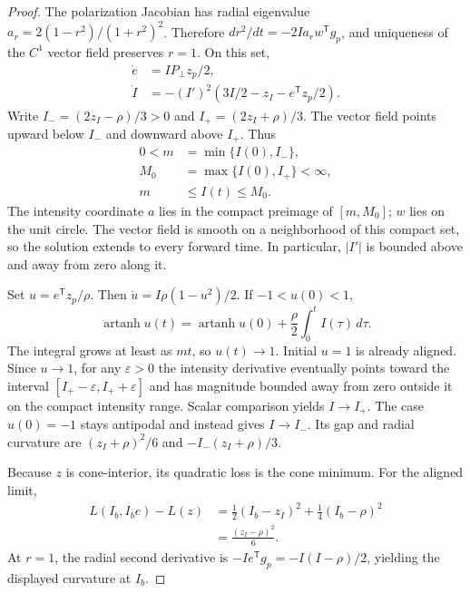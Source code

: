 \begin{proof}
The polarization Jacobian has radial eigenvalue $a_r=2(1-r^2)/(1+r^2)^2$. Therefore $d r^2/dt=-2Ia_r w^{\mathsf T}g_p$, and uniqueness of the $C^1$ vector field preserves $r=1$. On this set,
\begin{equation}
 \begin{aligned}
 \dot e&=I P_\perp z_p/2,\\
 \dot I&=-(I')^2(3I/2-z_I-e^{\mathsf T}z_p/2).
 \end{aligned}
\end{equation}
Write $I_-=(2z_I-\rho)/3>0$ and $I_+=(2z_I+\rho)/3$. The vector field points upward below $I_-$ and downward above $I_+$. Thus
\begin{equation}
 \begin{aligned}
 0<m&=\min\{I(0),I_-\},\\
 M_0&=\max\{I(0),I_+\}<\infty,\\
 m&\leq I(t)\leq M_0.
 \end{aligned}
\end{equation}
The intensity coordinate $a$ lies in the compact preimage of $[m,M_0]$; $w$ lies on the unit circle. The vector field is smooth on a neighborhood of this compact set, so the solution extends to every forward time. In particular, $|I'|$ is bounded above and away from zero along it.

Set $u=e^{\mathsf T}z_p/\rho$. Then $\dot u=I\rho(1-u^2)/2$. If $-1<u(0)<1$,
\begin{equation}
 \operatorname{artanh}u(t)=\operatorname{artanh}u(0)
        +\frac{\rho}{2}\int_0^t I(\tau)\,d\tau.
\end{equation}
The integral grows at least as $mt$, so $u(t)\to1$. Initial $u=1$ is already aligned. Since $u\to1$, for any $\varepsilon>0$ the intensity derivative eventually points toward the interval $[I_+-\varepsilon,I_++\varepsilon]$ and has magnitude bounded away from zero outside it on the compact intensity range. Scalar comparison yields $I\to I_+$. The case $u(0)=-1$ stays antipodal and instead gives $I\to I_-$. Its gap and radial curvature are $(z_I+\rho)^2/6$ and $-I_-(z_I+\rho)/3$.

Because $z$ is cone-interior, its quadratic loss is the cone minimum. For the aligned limit,
\begin{equation}
 \begin{aligned}
 L(I_b,I_b e)-L(z)
 &=\tfrac12(I_b-z_I)^2+\tfrac14(I_b-\rho)^2\\
 &=\frac{(z_I-\rho)^2}{6}.
 \end{aligned}
\end{equation}
At $r=1$, the radial second derivative is $-I e^{\mathsf T}g_p=-I(I-\rho)/2$, yielding the displayed curvature at $I_b$.
\end{proof}


